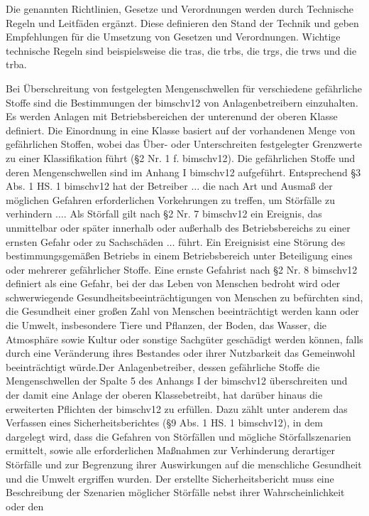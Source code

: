 Die genannten Richtlinien, Gesetze und Verordnungen werden durch Technische Regeln und Leitf\"aden erg\"anzt. Diese definieren den Stand der Technik und geben Empfehlungen f\"ur die Umsetzung von Gesetzen und Verordnungen. Wichtige technische Regeln sind beispielsweise die \ac{tras}, die \ac{trbs}, die \ac{trgs}, die \ac{trws} und die \ac{trba}.

Bei \"Uberschreitung von festgelegten Mengenschwellen f\"ur verschiedene gef\"ahrliche Stoffe sind die Bestimmungen der \ac{bimschv12} von Anlagenbetreibern einzuhalten. Es werden Anlagen mit Betriebsbereichen \glqq der unteren\grqq { }und \glqq der oberen Klasse definiert. Die Einordnung in eine Klasse basiert auf der vorhandenen Menge von gef\"ahrlichen Stoffen, wobei das {\"Uber- oder Unterschreiten} festgelegter Grenzwerte zu einer Klassifikation f\"uhrt {(\S 2 Nr. 1 f. \ac{bimschv12})}. Die gef\"ahrlichen Stoffe und deren Mengenschwellen sind im {Anhang I \ac{bimschv12}} aufgef\"uhrt. Entsprechend {\S 3 Abs. 1 HS. 1 \ac{bimschv12}} hat der Betreiber \glqq $\dots$ die nach Art und Ausma\ss{} der m\"oglichen Gefahren erforderlichen Vorkehrungen zu treffen, um St\"orf\"alle zu verhindern $\dots$\grqq { }. Als St\"orfall gilt nach {\S 2 Nr. 7 \ac{bimschv12}} \glqq ein Ereignis, das unmittelbar oder sp\"ater innerhalb oder au\ss{}erhalb des Betriebsbereichs zu einer ernsten Gefahr oder zu Sachsch\"aden $\dots$ f\"uhrt\grqq { }. Ein \glqq Ereignis\grqq { }ist eine \glqq St\"orung des bestimmungsgem\"a\ss{}en Betriebs in einem Betriebsbereich unter Beteiligung eines oder mehrerer gef\"ahrlicher Stoffe. Eine \glqq ernste Gefahr\grqq { }ist nach {\S 2 Nr. 8 \ac{bimschv12}} definiert als \glqq eine Gefahr, bei der das Leben von Menschen bedroht wird oder schwerwiegende Gesundheitsbeeintr\"achtigungen von Menschen zu bef\"urchten sind, die Gesundheit einer gro\ss{}en Zahl von Menschen beeintr\"achtigt werden kann oder die Umwelt, insbesondere Tiere und Pflanzen, der Boden, das Wasser, die Atmosph\"are sowie Kultur oder sonstige Sachg\"uter gesch\"adigt werden k\"onnen, falls durch eine Ver\"anderung ihres Bestandes oder ihrer Nutzbarkeit das Gemeinwohl beeintr\"achtigt w\"urde.\grqq { }Der Anlagenbetreiber, dessen gef\"ahrliche Stoffe die Mengenschwellen der Spalte 5 des Anhangs I der \ac{bimschv12} \"uberschreiten und der damit eine Anlage der \glqq oberen Klasse\grqq { }betreibt, hat dar\"uber hinaus die erweiterten Pflichten der \ac{bimschv12} zu erf\"ullen. Dazu z\"ahlt unter anderem das Verfassen eines Sicherheitsberichtes {(\S 9 Abs. 1 HS. 1 \ac{bimschv12})}, in dem dargelegt wird, dass \glqq die Gefahren von St\"orf\"allen und m\"ogliche St\"orfallszenarien ermittelt, sowie alle erforderlichen Ma\ss{}nahmen zur Verhinderung derartiger St\"orf\"alle und zur Begrenzung ihrer Auswirkungen auf die menschliche Gesundheit und die Umwelt ergriffen wurden. Der erstellte Sicherheitsbericht muss eine \glqq Beschreibung der Szenarien m\"oglicher St\"orf\"alle nebst ihrer Wahrscheinlichkeit oder den
